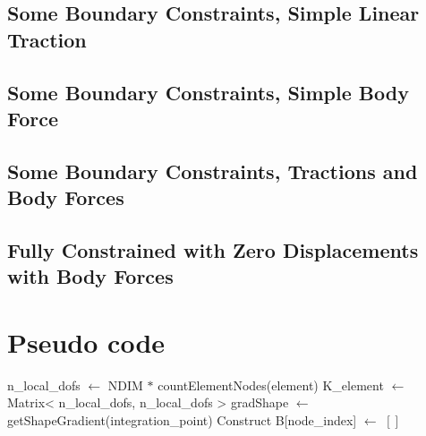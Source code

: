 \documentclass{article}
\begin{document}
\subsection{Some Boundary Constraints, Simple Linear Traction}

\subsection{Some Boundary Constraints, Simple Body Force}

\subsection{Some Boundary Constraints, Tractions and Body Forces}

\subsection{Fully Constrained with Zero Displacements with Body Forces}



\section{Pseudo code}

\begin{algorithm}
\begin{algorithmic}

    \State
\EndProcedure

\end{algorithmic}
\end{algorithm}

\begin{algorithm}
\begin{algorithmic}

    \State n\_local\_dofs $\gets$ NDIM $*$ countElementNodes(element)  
    \State K\_element $\gets$ Matrix< n\_local\_dofs, n\_local\_dofs >
        \State gradShape $\gets$ getShapeGradient(integration_point)
        \Comment Construct
            \State B[node\_index] $\gets$ $ \left[  \right]$
    
\EndProcedure

\end{algorithmic}
\end{algorithm}
\end{document}
